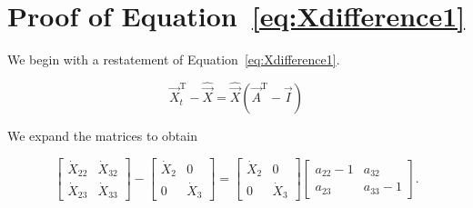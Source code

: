 %
%
%

\chapter{Proof of Equation~\ref{eq:Xdifference1}}
\label{app:Proof} 



We begin with a restatement of Equation~\ref{eq:Xdifference1}.

\begin{equation} \label{eq:Xdifference1Proof-1}
	\vec{X}_t^\mathrm{T} - \hat{\vec{X}} = \hat{\vec{X}}(\vec{A}^\mathrm{T} - \vec{I})
\end{equation}

\noindent We expand the matrices to obtain

\begin{equation} \label{eq:Xdifference1Proof-2}
	\begin{bmatrix}
		\dot{X}_{22} & \dot{X}_{32}	\\
		\dot{X}_{23} & \dot{X}_{33}
	\end{bmatrix}
	-
	\begin{bmatrix}
		\dot{X}_{2} & 0	\\
		0           & \dot{X}_{3}
	\end{bmatrix}
	=
	\begin{bmatrix}
		\dot{X}_{2} & 0	\\
		0           & \dot{X}_{3}
	\end{bmatrix}
	\begin{bmatrix}
		a_{22}-1 & a_{32}	\\
		a_{23}   & a_{33}-1
	\end{bmatrix}.
\end{equation}

